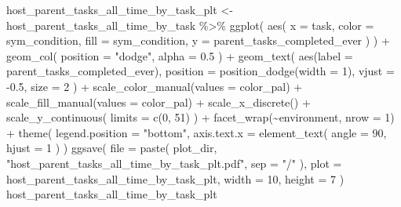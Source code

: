\documentclass[
]{book}
\newenvironment{Shaded}{\begin{snugshade}}{\end{snugshade}}
\newcommand{\AttributeTok}[1]{\textcolor[rgb]{0.77,0.63,0.00}{#1}}
\newcommand{\DecValTok}[1]{\textcolor[rgb]{0.00,0.00,0.81}{#1}}
\newcommand{\FloatTok}[1]{\textcolor[rgb]{0.00,0.00,0.81}{#1}}
\newcommand{\FunctionTok}[1]{\textcolor[rgb]{0.00,0.00,0.00}{#1}}
\newcommand{\NormalTok}[1]{#1}
\newcommand{\OtherTok}[1]{\textcolor[rgb]{0.56,0.35,0.01}{#1}}
\newcommand{\SpecialCharTok}[1]{\textcolor[rgb]{0.00,0.00,0.00}{#1}}
\newcommand{\StringTok}[1]{\textcolor[rgb]{0.31,0.60,0.02}{#1}}
\begin{document}
\begin{Shaded}
\begin{Highlighting}[]
\NormalTok{host\_parent\_tasks\_all\_time\_by\_task\_plt }\OtherTok{\textless{}{-}}\NormalTok{ host\_parent\_tasks\_all\_time\_by\_task }\SpecialCharTok{\%\textgreater{}\%}
  \FunctionTok{ggplot}\NormalTok{(}
    \FunctionTok{aes}\NormalTok{(}
      \AttributeTok{x =}\NormalTok{ task,}
      \AttributeTok{color =}\NormalTok{ sym\_condition,}
      \AttributeTok{fill =}\NormalTok{ sym\_condition,}
      \AttributeTok{y =}\NormalTok{ parent\_tasks\_completed\_ever}
\NormalTok{    )}
\NormalTok{  ) }\SpecialCharTok{+}
  \FunctionTok{geom\_col}\NormalTok{(}
    \AttributeTok{position =} \StringTok{"dodge"}\NormalTok{,}
    \AttributeTok{alpha =} \FloatTok{0.5}
\NormalTok{  ) }\SpecialCharTok{+}
  \FunctionTok{geom\_text}\NormalTok{(}
    \FunctionTok{aes}\NormalTok{(}\AttributeTok{label =}\NormalTok{ parent\_tasks\_completed\_ever),}
    \AttributeTok{position =} \FunctionTok{position\_dodge}\NormalTok{(}\AttributeTok{width =} \DecValTok{1}\NormalTok{),}
    \AttributeTok{vjust =} \SpecialCharTok{{-}}\FloatTok{0.5}\NormalTok{,}
    \AttributeTok{size =} \DecValTok{2}
\NormalTok{  ) }\SpecialCharTok{+}
  \FunctionTok{scale\_color\_manual}\NormalTok{(}\AttributeTok{values =}\NormalTok{ color\_pal) }\SpecialCharTok{+}
  \FunctionTok{scale\_fill\_manual}\NormalTok{(}\AttributeTok{values =}\NormalTok{ color\_pal) }\SpecialCharTok{+}
  \FunctionTok{scale\_x\_discrete}\NormalTok{() }\SpecialCharTok{+}
  \FunctionTok{scale\_y\_continuous}\NormalTok{(}
    \AttributeTok{limits =} \FunctionTok{c}\NormalTok{(}\DecValTok{0}\NormalTok{, }\DecValTok{51}\NormalTok{)}
\NormalTok{  ) }\SpecialCharTok{+}
  \FunctionTok{facet\_wrap}\NormalTok{(}\SpecialCharTok{\textasciitilde{}}\NormalTok{environment, }\AttributeTok{nrow =} \DecValTok{1}\NormalTok{) }\SpecialCharTok{+}
  \FunctionTok{theme}\NormalTok{(}
    \AttributeTok{legend.position =} \StringTok{"bottom"}\NormalTok{,}
    \AttributeTok{axis.text.x =} \FunctionTok{element\_text}\NormalTok{(}
      \AttributeTok{angle =} \DecValTok{90}\NormalTok{,}
      \AttributeTok{hjust =} \DecValTok{1}
\NormalTok{    )}
\NormalTok{  )}
\FunctionTok{ggsave}\NormalTok{(}
  \AttributeTok{file =} \FunctionTok{paste}\NormalTok{(}
\NormalTok{    plot\_dir,}
    \StringTok{"host\_parent\_tasks\_all\_time\_by\_task\_plt.pdf"}\NormalTok{,}
    \AttributeTok{sep =} \StringTok{"/"}
\NormalTok{  ),}
  \AttributeTok{plot =}\NormalTok{ host\_parent\_tasks\_all\_time\_by\_task\_plt,}
  \AttributeTok{width =} \DecValTok{10}\NormalTok{,}
  \AttributeTok{height =} \DecValTok{7}
\NormalTok{)}
\NormalTok{host\_parent\_tasks\_all\_time\_by\_task\_plt}
\end{Highlighting}
\end{Shaded}
\end{document}
